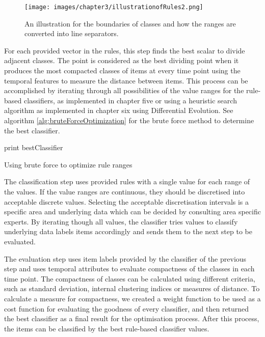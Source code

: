 \begin{figure}[!h]
	\centering
	\texttt{[image: images/chapter3/illustrationofRules2.png]}
	\caption{An illustration for the boundaries of classes and how the ranges are converted into line separators.}
	\label{fig:illustrationofRules2}
\end{figure}


For each provided vector in the rules, this step finds the best scalar to divide adjacent classes. The point is considered as the best dividing point when it produces the most compacted classes of items at every time point using the temporal features to measure the distance between items. This process can be accomplished by iterating through all possibilities of the value ranges for the rule-based classifiers, as implemented in chapter five or using a heuristic search algorithm as implemented in chapter six using Differential Evolution. See algorithm \ref{alg:bruteForceOptimization} for the brute force method to determine the best classifier.

\begin{algorithm}[!h]
	\SetAlgoLined
	
	print bestClassifier\;
	
	
	\caption{Using brute force to optimize rule ranges}
	\label{alg:bruteForceOptimization}
\end{algorithm}


The classification step uses provided rules with a single value for each range of the values. If the value ranges are continuous, they should be discretised into acceptable discrete values. Selecting the acceptable discretisation intervals is a specific area and underlying data which can be decided by consulting area specific experts. By iterating though all values, the classifier tries values to classify underlying data labels items accordingly and sends them to the next step to be evaluated.

The evaluation step uses item labels provided by the classifier of the previous step and uses temporal attributes to evaluate compactness of the classes in each time point. The compactness of classes can be calculated using different criteria, such as standard deviation, internal clustering indices or measures of distance. To calculate a measure for compactness, we created a weight function to be used as a cost function for evaluating the goodness of every classifier, and then returned the best classifier as a final result for the optimisation process. After this process, the items can be classified by the best rule-based classifier values.

